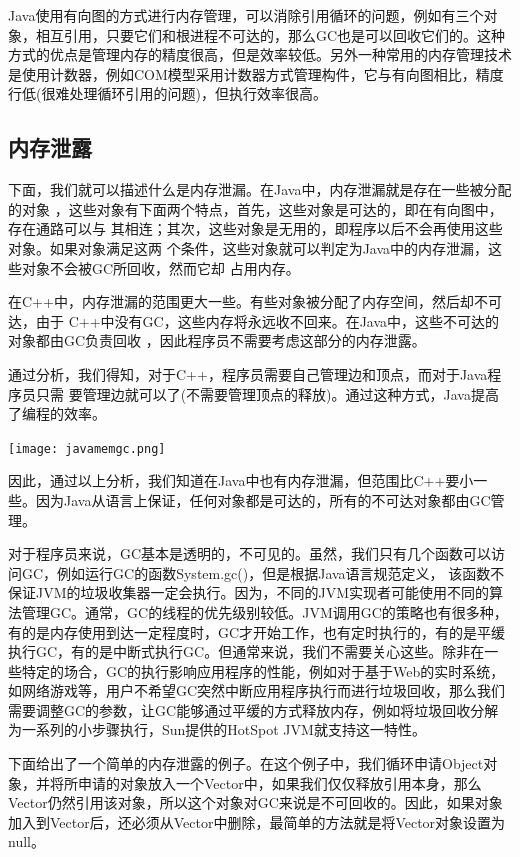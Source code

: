 \documentclass[a4paper, 11pt]{article}
\begin{document}
Java使用有向图的方式进行内存管理，可以消除引用循环的问题，例如有三个对象，相互引用，只要它们和根进程不可达的，那么GC也是可以回收它们的。这种方式的优点是管理内存的精度很高，但是效率较低。另外一种常用的内存管理技术是使用计数器，例如COM模型采用计数器方式管理构件，它与有向图相比，精度行低(很难处理循环引用的问题)，但执行效率很高。

\subsection{内存泄露}
下面，我们就可以描述什么是内存泄漏。在Java中，内存泄漏就是存在一些被分配的对象
，这些对象有下面两个特点，首先，这些对象是可达的，即在有向图中，存在通路可以与
其相连；其次，这些对象是无用的，即程序以后不会再使用这些对象。如果对象满足这两
个条件，这些对象就可以判定为Java中的内存泄漏，这些对象不会被GC所回收，然而它却
占用内存。

在C++中，内存泄漏的范围更大一些。有些对象被分配了内存空间，然后却不可达，由于
C++中没有GC，这些内存将永远收不回来。在Java中，这些不可达的对象都由GC负责回收
，因此程序员不需要考虑这部分的内存泄露。

通过分析，我们得知，对于C++，程序员需要自己管理边和顶点，而对于Java程序员只需
要管理边就可以了(不需要管理顶点的释放)。通过这种方式，Java提高了编程的效率。
\begin{center}
\texttt{[image: javamemgc.png]}
\end{center}


因此，通过以上分析，我们知道在Java中也有内存泄漏，但范围比C++要小一些。因为Java从语言上保证，任何对象都是可达的，所有的不可达对象都由GC管理。

对于程序员来说，GC基本是透明的，不可见的。虽然，我们只有几个函数可以访问GC，例如运行GC的函数System.gc()，但是根据Java语言规范定义， 该函数不保证JVM的垃圾收集器一定会执行。因为，不同的JVM实现者可能使用不同的算法管理GC。通常，GC的线程的优先级别较低。JVM调用GC的策略也有很多种，有的是内存使用到达一定程度时，GC才开始工作，也有定时执行的，有的是平缓执行GC，有的是中断式执行GC。但通常来说，我们不需要关心这些。除非在一些特定的场合，GC的执行影响应用程序的性能，例如对于基于Web的实时系统，如网络游戏等，用户不希望GC突然中断应用程序执行而进行垃圾回收，那么我们需要调整GC的参数，让GC能够通过平缓的方式释放内存，例如将垃圾回收分解为一系列的小步骤执行，Sun提供的HotSpot JVM就支持这一特性。

下面给出了一个简单的内存泄露的例子。在这个例子中，我们循环申请Object对象，并将所申请的对象放入一个Vector中，如果我们仅仅释放引用本身，那么Vector仍然引用该对象，所以这个对象对GC来说是不可回收的。因此，如果对象加入到Vector后，还必须从Vector中删除，最简单的方法就是将Vector对象设置为null。
\end{document}
